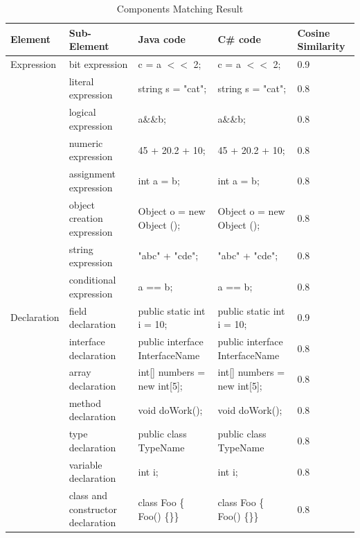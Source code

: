 \begin{table}
	\caption{Components Matching Result}
	\label{tab:freq}
	
	\begin{tabular}{p{2cm}|l|p{5cm}|p{5cm}|p{1cm}}
		
		\hline
		Element &Sub-Element& Java code &C\# code& Cosine Similarity\\
		\hline
		Expression & bit expression & c = a $<<$ 2; & c = a $<<$ 2; & 0.9 \\\cline{2-5}
		& literal expression & string s = "cat"; & string s = "cat";  & 0.8\\\cline{2-5}
		& logical expression & a\&\&b; & a\&\&b;  & 0.8\\\cline{2-5}
		& numeric expression & 45 + 20.2 + 10; & 45 + 20.2 + 10;  & 0.8\\\cline{2-5}
		& assignment expression & int a = b; & int a = b;  & 0.8\\\cline{2-5}
		& object creation expression & Object o = new Object (); & Object o = new Object ();  & 0.8\\\cline{2-5}
		& string expression & "abc" + "cde"; & "abc" + "cde";  & 0.8\\\cline{2-5}
		& conditional expression & a == b; & a == b;  & 0.8\\\cline{2-5}
		\hline
		
	
		Declaration & field declaration & public static int i = 10; & public static int i = 10; & 0.9 \\\cline{2-5}
		& interface declaration & public interface InterfaceName {} & public interface InterfaceName {} & 0.8\\\cline{2-5}
		& array declaration & int[] numbers = new int[5]; & int[] numbers = new int[5];  & 0.8\\\cline{2-5}
		& method declaration & void doWork(); & void doWork();  & 0.8\\\cline{2-5}
		& type declaration & public class TypeName & public class TypeName  & 0.8\\\cline{2-5}
		& variable declaration & int i; & int i;  & 0.8\\\cline{2-5}
		& class and constructor declaration & class Foo \{ Foo() \{\}\} & class Foo \{ Foo() \{\}\}  & 0.8\\\cline{2-5}
		

\end{tabular}
\end{table}
